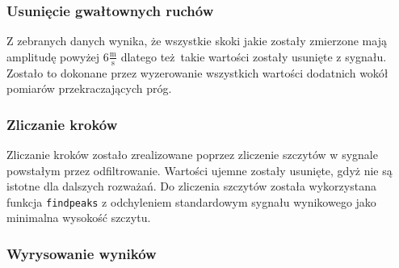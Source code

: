 \documentclass[a4paper, 12pt, titlepage]{article}
\begin{document}
            \subsubsection{Usunięcie gwałtownych ruchów}
                Z zebranych danych wynika, że wszystkie skoki jakie 
                zostały zmierzone mają amplitudę powyżej $6 \frac{
                    \mathrm{m}}{\mathrm{s}}$ dlatego też takie wartości
                zostały usunięte z sygnału. Zostało to dokonane przez
                wyzerowanie wszystkich wartości dodatnich wokół pomiarów
                przekraczających próg.
                
            \subsubsection{Zliczanie kroków}
                Zliczanie kroków zostało zrealizowane poprzez zliczenie
                szczytów w sygnale powstałym przez odfiltrowanie.
                Wartości ujemne zostały usunięte, gdyż nie są istotne
                dla dalszych rozważań. Do zliczenia szczytów została 
                wykorzystana funkcja \texttt{findpeaks} z odchyleniem
                standardowym sygnału wynikowego jako minimalna wysokość
                szczytu.
                
            \subsubsection{Wyrysowanie wyników}
                
\end{document}
